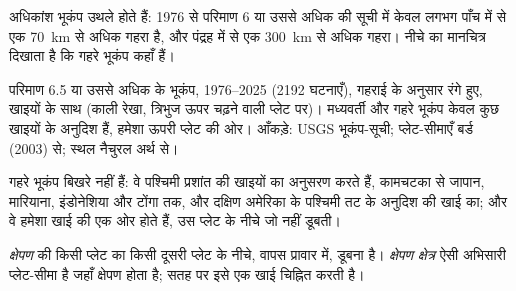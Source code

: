 अधिकांश भूकंप उथले होते हैं: 1976 से परिमाण 6 या उससे अधिक की सूची में
केवल लगभग पाँच में से एक \qty{70}{km} से अधिक गहरा है, और पंद्रह में से एक
\qty{300}{km} से अधिक गहरा। नीचे का मानचित्र दिखाता है कि गहरे भूकंप कहाँ हैं।

\begin{omfigure}

{\small परिमाण 6.5 या उससे अधिक के भूकंप, 1976--2025 (2192 घटनाएँ),
गहराई के अनुसार रंगे हुए, खाइयों के साथ (काली रेखा, त्रिभुज ऊपर चढ़ने वाली
प्लेट पर)। मध्यवर्ती और गहरे भूकंप केवल कुछ खाइयों के अनुदिश हैं,
हमेशा ऊपरी प्लेट की ओर। आँकड़े: USGS भूकंप-सूची;
प्लेट-सीमाएँ बर्ड (2003) से; स्थल नैचुरल अर्थ से।}
\end{omfigure}

गहरे भूकंप बिखरे नहीं हैं: वे पश्चिमी प्रशांत की खाइयों का अनुसरण करते हैं,
कामचटका से जापान, मारियाना, इंडोनेशिया और टोंगा तक,
और दक्षिण अमेरिका के पश्चिमी तट के अनुदिश की खाई का; और वे हमेशा खाई की
एक ओर होते हैं, उस प्लेट के नीचे जो नहीं डूबती।

\begin{definition}[क्षेपण; क्षेपण क्षेत्र]\label{def:g11:subduction-zones:subduction}
\emph{क्षेपण}  की किसी प्लेट का
किसी दूसरी प्लेट के नीचे, वापस प्रावार में, डूबना है। \emph{क्षेपण
क्षेत्र} ऐसी अभिसारी प्लेट-सीमा है जहाँ क्षेपण
होता है; सतह पर इसे एक खाई चिह्नित करती है।
\end{definition}

